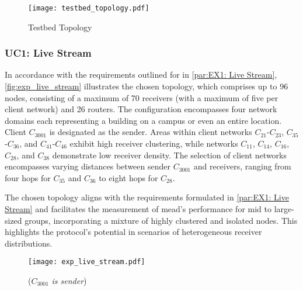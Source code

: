 \begin{figure}
    \begin{center}
        \texttt{[image: testbed\_topology.pdf]}
    \end{center}
    \caption{Testbed Topology}
    \label{fig:topology}
\end{figure}




\subsubsection{UC1: Live Stream} %
\label{par:impl UC1: Live Stream}
In accordance with the requirements outlined for \uci{} in
    \autoref{par:EX1: Live Stream}, \autoref{fig:exp_live_stream} illustrates
    the chosen topology, which comprises up to 96 nodes, consisting of a
    maximum of 70 receivers (with a maximum of five per client network) and 26
    routers.
The configuration encompasses four network domains each representing a building
    on a campus or even an entire location.
Client $C_{3001}$ is designated as the sender.
Areas within client networks $C_{21}$-$C_{23}$, $C_{35}$-$C_{36}$, and
    $C_{41}$-$C_{46}$ exhibit high receiver clustering, while networks
    $C_{11}$, $C_{14}$, $C_{16}$, $C_{28}$, and $C_{38}$ demonstrate low
    receiver density.
The selection of client networks encompasses varying distances between sender
    $C_{3001}$ and receivers, ranging from four hops for $C_{35}$ and $C_{36}$
    to eight hops for $C_{28}$.

The chosen topology aligns with the requirements formulated in
    \autoref{par:EX1: Live Stream} and facilitates the measurement of
    \gls{mead}'s performance for mid to large-sized groups, incorporating a
    mixture of highly clustered and isolated nodes.
This highlights the protocol's potential in scenarios of heterogeneous receiver
    distributions.

\begin{figure}
    \begin{center}
        \texttt{[image: exp\_live\_stream.pdf]}
    \end{center}
    \caption[UC1: Live Stream]{\nuci{} ($C_{3001}$ \textit{is sender})}
    \label{fig:exp_live_stream}
\end{figure}


